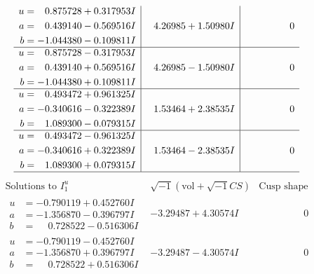 \documentclass[1p]{elsarticle_modified}
\theoremstyle{definition}
\newcommand{\I}{\sqrt{-1}}
\begin{document}
$$\begin{array}{c|c|c}
\begin{aligned}
u &= \phantom{-}0.875728 + 0.317953 I \\
a &= \phantom{-}0.439140 - 0.569516 I \\
b &= -1.044380 - 0.109811 I\end{aligned}
 & \phantom{-}4.26985 + 1.50980 I & \phantom{-0.000000 } 0 \\ \hline\begin{aligned}
u &= \phantom{-}0.875728 - 0.317953 I \\
a &= \phantom{-}0.439140 + 0.569516 I \\
b &= -1.044380 + 0.109811 I\end{aligned}
 & \phantom{-}4.26985 - 1.50980 I & \phantom{-0.000000 } 0 \\ \hline\begin{aligned}
u &= \phantom{-}0.493472 + 0.961325 I \\
a &= -0.340616 - 0.322389 I \\
b &= \phantom{-}1.089300 - 0.079315 I\end{aligned}
 & \phantom{-}1.53464 + 2.38535 I & \phantom{-0.000000 } 0 \\ \hline\begin{aligned}
u &= \phantom{-}0.493472 - 0.961325 I \\
a &= -0.340616 + 0.322389 I \\
b &= \phantom{-}1.089300 + 0.079315 I\end{aligned}
 & \phantom{-}1.53464 - 2.38535 I & \phantom{-0.000000 } 0\\
 \hline 
 \end{array}$$\newpage$$\begin{array}{c|c|c}  
\text{Solutions to }I^u_{1}& \I (\text{vol} + \sqrt{-1}CS) & \text{Cusp shape}\\
 \hline 
\begin{aligned}
u &= -0.790119 + 0.452760 I \\
a &= -1.356870 - 0.396797 I \\
b &= \phantom{-}0.728522 - 0.516306 I\end{aligned}
 & -3.29487 + 4.30574 I & \phantom{-0.000000 } 0 \\ \hline\begin{aligned}
u &= -0.790119 - 0.452760 I \\
a &= -1.356870 + 0.396797 I \\
b &= \phantom{-}0.728522 + 0.516306 I\end{aligned}
 & -3.29487 - 4.30574 I & \phantom{-0.000000 } 0 \\ \hline\begin{aligned}

\end{aligned}
\end{array}$$
\end{document}
